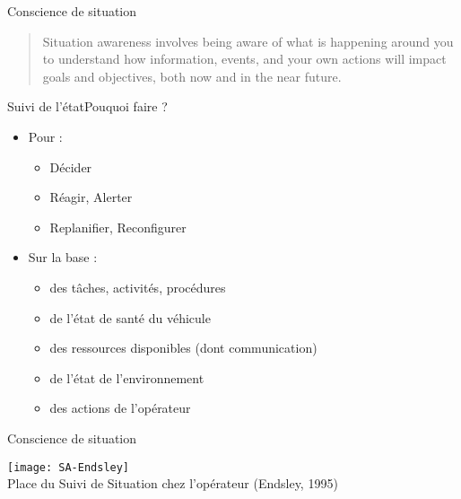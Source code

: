 \documentclass[compress]{beamer}
\begin{document}
\begin{frame}{Conscience de situation}
\begin{quote}
Situation awareness involves being aware of what is happening
around you to understand how information, events, and your own
actions will impact goals and objectives, both now and in the near
future.
\end{quote}
\end{frame}

\begin{frame}{Suivi de l'état}{Pouquoi faire ?}
\begin{itemize}
\item Pour :
	\begin{itemize}
	\item Décider
	\item Réagir, Alerter
	\item Replanifier, Reconfigurer
	\end{itemize}
\item Sur la base :
	\begin{itemize}
	\item des tâches, activités, procédures
	\item de l'état de santé du véhicule
	\item des ressources disponibles (dont communication)
	\item de l'état de l'environnement
	\item des actions de l'opérateur
	\end{itemize}
\end{itemize}
\end{frame}

\begin{frame}{Conscience de situation}
\begin{center}
	\texttt{[image: SA-Endsley]}\\
	Place du Suivi de Situation chez l'opérateur (Endsley, 1995)
\end{center}
\end{frame}
\end{document}
